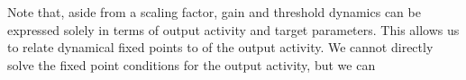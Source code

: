 \documentclass[10pt,a4paper]{article}
\begin{document}
Note that, aside from a scaling factor, gain and threshold dynamics can be expressed solely in terms of output activity and target parameters. This allows us to relate dynamical fixed points to of the output activity. We cannot directly solve the fixed point conditions for the output activity, but we can 

\section{}
\end{document}
